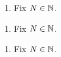 \begin{algorithm}[Matrix] \hfill
\begin{enumerate}
	\item{Fix $N \in \mathbb{N}$}.
\end{enumerate}
\end{algorithm}

\begin{algorithm}[Matrix] \hfill
\begin{enumerate}
	\item{Fix $N \in \mathbb{N}$}.
\end{enumerate}
\end{algorithm}

\begin{algorithm}[Matrix] \hfill
\begin{enumerate}
	\item{Fix $N \in \mathbb{N}$}.
\end{enumerate}
\end{algorithm}

